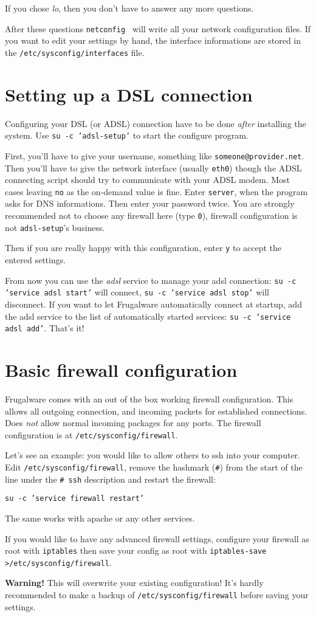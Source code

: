 If you chose \textit{lo}, then you don't have to answer any more questions.
 
After these questions {\tt netconfig } will write all your network configuration files. If you want to edit your settings by hand, the interface informations are stored in the {\tt /etc/sysconfig/interfaces} file.

\section{Setting up a DSL connection}

Configuring your DSL (or ADSL) connection have to be done \textit{after} installing the system. Use {\tt su -c 'adsl-setup'} to start the configure program.

First, you'll have to give your username, something like {\tt someone@provider.net}. Then you'll have to give the network interface (usually {\tt eth0}) though the ADSL connecting script should try to communicate with your ADSL modem. Most cases leaving {\tt no} as the on-demand value is fine. Enter {\tt server}, when the program asks for DNS informations. Then enter your password twice. You are strongly recommended not to choose any firewall here (type {\tt 0}), firewall configuration is not {\tt adsl-setup}'s business.

Then if you are really happy with this configuration, enter {\tt y} to accept the entered settings.

From now you can use the \textit{adsl} service to manage your adsl connection: {\tt su -c 'service adsl start'} will connect, {\tt su -c 'service adsl stop'} will disconnect. If you want to let Frugalware automatically connect at startup, add the adsl service to the list of automatically started services: {\tt su -c 'service adsl add'}. That's it!

\section{Basic firewall configuration}

Frugalware comes with an out of the box working firewall configuration. This allows all outgoing connection, and incoming packets for established connections. Does \textit{not} allow normal incoming packages for any ports. The firewall configuration is at {\tt /etc/sysconfig/firewall}.

Let's see an example: you would like to allow others to ssh into your computer. Edit {\tt /etc/sysconfig/firewall}, remove the hashmark ({\tt #}) from the start of the line under the {\tt # ssh} description and restart the firewall:

{\tt su -c 'service firewall restart'}

The same works with apache or any other services.

If you would like to have any advanced firewall settings, configure your firewall as root with {\tt iptables} then save your config as root with {\tt iptables-save >/etc/sysconfig/firewall}.

\textbf{Warning!} This will overwrite your existing configuration! It's hardly recommended to make a backup of {\tt /etc/sysconfig/firewall} before saving your settings.
